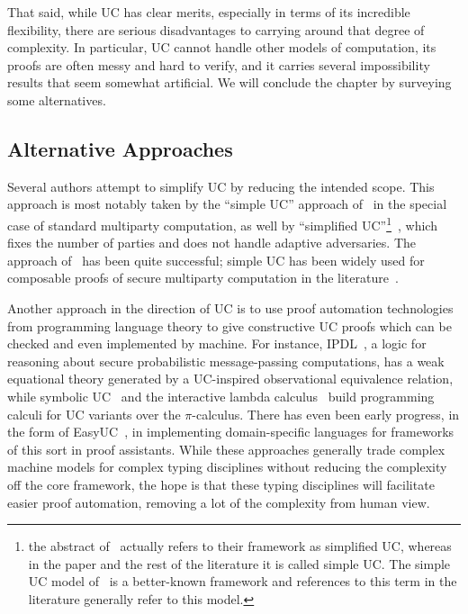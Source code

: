 That said, while UC has clear merits, especially in terms of its incredible
flexibility, there are serious disadvantages to carrying around that degree of
complexity. In particular, UC cannot handle other models of computation, its
proofs are often messy and hard to verify, and it carries several
impossibility results that seem somewhat artificial. We will conclude the
chapter by surveying some alternatives.

\subsection{Alternative Approaches}

Several authors attempt to simplify UC by reducing the intended scope. This
approach is most notably taken by the ``simple UC'' approach of~\cite{ccl-2015}
in the special case of standard multiparty computation, as well by ``simplified
UC''\footnote{%
  the abstract of~\cite{ccl-2015} actually refers to their framework as
  simplified UC, whereas in the paper and the rest of the literature it is
  called simple UC. The simple UC model of~\cite{ccl-2015} is a better-known
framework and references to this term in the literature generally refer to this
model.}~\cite{wikstr-2016}, which fixes the number of parties and does not handle
adaptive adversaries. The approach of~\cite{ccl-2015} has been quite successful;
simple UC has been widely used for composable proofs of secure multiparty computation
in the literature~\cite{mansy-2019,hazay-2020,lindell-2022,scheffler-2023}.

Another approach in the direction of UC is to use proof automation technologies
from programming language theory to give constructive UC proofs which can be
checked and even implemented by machine. For instance,
IPDL~\cite{morisett-et-al-2021}, a logic for reasoning about secure
probabilistic message-passing computations, has a weak equational theory
generated by a UC-inspired observational equivalence relation, while symbolic
UC~\cite{bohl-unruh-2013} and the interactive lambda
calculus~\cite{liao-et-al-2019} build programming calculi for UC variants over
the $\pi$-calculus. There has even been early progress, in the form of
EasyUC~\cite{canetti-et-al-2019}, in implementing domain-specific languages for
frameworks of this sort in proof assistants. While these approaches generally
trade complex machine models for complex typing disciplines without reducing the
complexity off the core framework, the hope is that these typing disciplines
will facilitate easier proof automation, removing a lot of the complexity from
human view.

